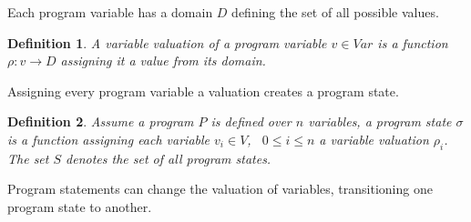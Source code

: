 \documentclass{article}
\newcounter{example}[section]
\newtheorem{mydef}{Definition}
\newcommand\mycom[1]{}
\newcommand\mycom[1]{#1}
\newcommand{\dd}[1]{\mycom{\todo[color=orange!40,inline]{\small DD: #1}}}
\newcommand{\ts}[1]{\mycom{\todo[color=green!40,inline]{\small TS: #1}}}
\begin{document}
\begin{example}
\begin{figure}[H]
    \label{fig:ex:p0:cfg}
\end{figure}
\end{example}

\dd{It is useful to wrap all the function symbols in Latex macros}
\ts{And to use mathit for identifiers consisting of several letters (like $\mathit{Var}$)}
Each program variable has a domain $D$ defining the set of all possible values.
\begin{mydef}
    A variable valuation of a program variable $v \in Var$ is a function $\rho: v \rightarrow D$  assigning it a value from its domain.
\end{mydef}
Assigning every program variable a valuation creates a program state.


\begin{mydef}
    Assume a program $P$ is defined over $n$ variables, a program state $\sigma$ is a function assigning each variable $v_i \in V$, \ $0 \leq i \leq n$ a variable valuation $\rho_i$. The set $S$ denotes the set of all program states.
\end{mydef}

Program statements can change the valuation of variables, transitioning one program state to another.
\end{document}
